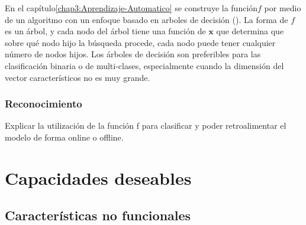 En el capítulo\ref{chap3:Aprendizaje-Automatico} se construye la
función$f$ por medio de un algoritmo con un enfoque basado en arboles
de decisión (). La forma de $f$ es un árbol, y cada nodo
del árbol tiene una función de $\boldsymbol{x}$ que determina que
sobre qué nodo hijo la búsqueda procede, cada nodo puede tener cualquier
número de nodos hijos. Los árboles de decisión son preferibles para
las clasificación binaria o de multi-clases, especialmente cuando
la dimensión del vector característicos no es muy grande\cite{Rajaraman2011}.

\subsubsection{Reconocimiento}

Explicar la utilización de la función f para clasificar y poder retroalimentar
el modelo de forma online o offline.

\section{Capacidades deseables}

\subsection{Características no funcionales}

